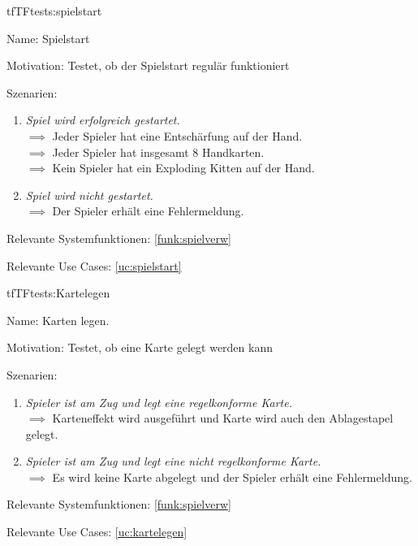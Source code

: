 \begin{description}[leftmargin=5em, style=sameline]

\begin{lhp}{tf}{TF}{tests:spielstart}
	\item [Name:] Spielstart
	\item [Motivation:] Testet, ob der Spielstart regulär funktioniert
	\item [Szenarien:] \hfill
		\begin{enumerate}
			\item \textit{Spiel wird erfolgreich gestartet.} \\ $\implies$ Jeder Spieler hat eine Entschärfung auf der Hand.
															 \\ $\implies$ Jeder Spieler hat insgesamt 8 Handkarten.
															 \\ $\implies$ Kein Spieler hat ein Exploding Kitten auf der Hand.
			\item \textit{Spiel wird nicht gestartet.} \\ $\implies$ Der Spieler erhält eine Fehlermeldung.
		\end{enumerate}
	\item [Relevante Systemfunktionen:] \ref{funk:spielverw}
	\item [Relevante Use Cases:] \ref{uc:spielstart}
\end{lhp}

\end{description}

\begin{description}[leftmargin=5em, style=sameline]

\begin{lhp}{tf}{TF}{tests:Kartelegen}
	\item [Name:] Karten legen.
	\item [Motivation:] Testet, ob eine Karte gelegt werden kann
	\item [Szenarien:] \hfill
		\begin{enumerate}
			\item \textit{Spieler ist am Zug und legt eine regelkonforme Karte.} \\ $\implies$ Karteneffekt wird ausgeführt und Karte wird auch den Ablagestapel gelegt.
			\item \textit{Spieler ist am Zug und legt eine nicht regelkonforme Karte.} \\ $\implies$ Es wird keine Karte abgelegt und der Spieler erhält eine Fehlermeldung.
		\end{enumerate}
	\item [Relevante Systemfunktionen:] \ref{funk:spielverw}
	\item [Relevante Use Cases:] \ref{uc:kartelegen}
\end{lhp}

\end{description}

